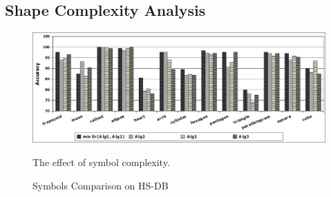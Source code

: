 \documentclass[preprint,10pt,5p,twocolumn]{elsarticle}
\begin{document}
\subsection{Shape Complexity Analysis}
\label{sec:ShapeComplexityExperiments}

\begin{figure}
	\centering
		\includegraphics[scale=0.5]{images/testsym.jpg}
	\caption{Symbols Comparison on HS-DB} The effect of symbol complexity.  %
	\label{fig:test2}
\end{figure}  
\end{document}
